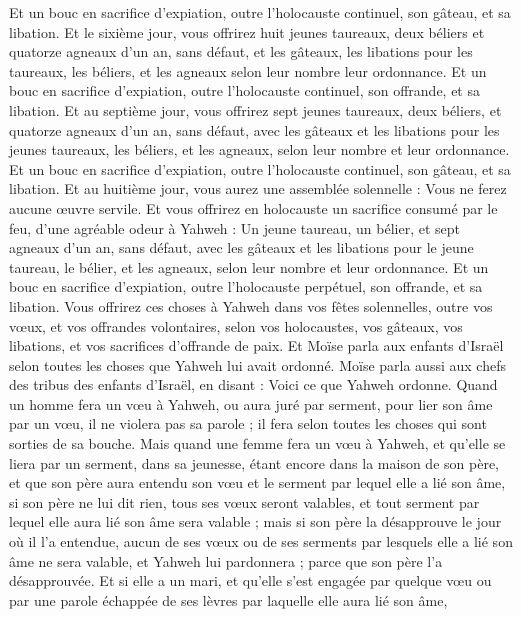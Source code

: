 \begin{multicols}{2}
Et un bouc en sacrifice d'expiation, outre l'holocauste continuel, son gâteau, et sa libation.
Et le sixième jour, vous offrirez huit jeunes taureaux, deux béliers et quatorze agneaux d'un an, sans défaut,
et les gâteaux, les libations pour les taureaux, les béliers, et les agneaux selon leur nombre leur ordonnance.
Et un bouc en sacrifice d'expiation, outre l'holocauste continuel, son offrande, et sa libation.
Et au septième jour, vous offrirez sept jeunes taureaux, deux béliers, et quatorze agneaux d'un an, sans défaut,
avec les gâteaux et les libations pour les jeunes taureaux, les béliers, et les agneaux, selon leur nombre et leur ordonnance.
Et un bouc en sacrifice d'expiation, outre l'holocauste continuel, son gâteau, et sa libation.
Et au huitième jour, vous aurez une assemblée solennelle : Vous ne ferez aucune œuvre servile.
Et vous offrirez en holocauste un sacrifice consumé par le feu, d'une agréable odeur à Yahweh : Un jeune taureau, un bélier, et sept agneaux d'un an, sans défaut,
avec les gâteaux et les libations pour le jeune taureau, le bélier, et les agneaux, selon leur nombre et leur ordonnance.
Et un bouc en sacrifice d'expiation, outre l'holocauste perpétuel, son offrande, et sa libation.
Vous offrirez ces choses à Yahweh dans vos fêtes solennelles, outre vos vœux, et vos offrandes volontaires, selon vos holocaustes, vos gâteaux, vos libations, et vos sacrifices d'offrande de paix.
\VerseOne{}Et Moïse parla aux enfants d'Israël selon toutes les choses que Yahweh lui avait ordonné.
Moïse parla aussi aux chefs des tribus des enfants d'Israël, en disant : Voici ce que Yahweh ordonne.
Quand un homme fera un vœu à Yahweh, ou aura juré par serment, pour lier son âme par un vœu, il ne violera pas sa parole ; il fera selon toutes les choses qui sont sorties de sa bouche.
Mais quand une femme fera un vœu à Yahweh, et qu'elle se liera par un serment, dans sa jeunesse, étant encore dans la maison de son père,
et que son père aura entendu son vœu et le serment par lequel elle a lié son âme, si son père ne lui dit rien, tous ses vœux seront valables, et tout serment par lequel elle aura lié son âme sera valable ;
mais si son père la désapprouve le jour où il l'a entendue, aucun de ses vœux ou de ses serments par lesquels elle a lié son âme ne sera valable, et Yahweh lui pardonnera ; parce que son père l'a désapprouvée.
Et si elle a un mari, et qu'elle s'est engagée par quelque vœu ou par une parole échappée de ses lèvres par laquelle elle aura lié son âme,

\end{multicols}
